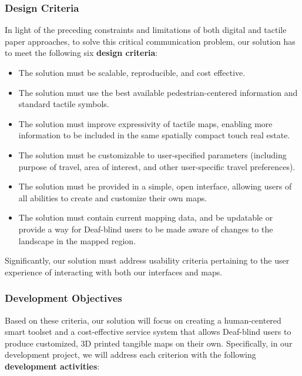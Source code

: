 \subsubsection{Design Criteria}
\label{sec:design-criteria}
In light of the preceding constraints and limitations of both digital and tactile paper approaches, to solve this critical communication problem, our solution has to meet the following six \textbf{design criteria}: 
\begin{itemize}
 \item The solution must be scalable, reproducible, and cost effective. 
 \item The solution must use the best available pedestrian-centered information and standard tactile symbols. 
 \item The solution must improve expressivity of tactile maps, enabling more information to be included in the same spatially compact touch real estate.
 \item The solution must be customizable to user-specified parameters (including purpose of travel, area of interest, and other user-specific travel preferences). 
 \item The solution must be provided in a simple, open interface, allowing users of all abilities to create and customize their own maps. 
 \item The solution must contain current mapping data, and be updatable or provide a way for Deaf-blind users to be made aware of changes to the landscape in the mapped region.
\end{itemize}
Significantly, our solution must address usability criteria pertaining to the user experience of interacting with both our interfaces and maps. 

\subsubsection{Development Objectives}
\label{sec:design-objectives}

Based on these criteria, our solution will focus on creating a human-centered smart toolset and a cost-effective service system that allows Deaf-blind users to produce customized, 3D printed tangible maps on their own. %
Specifically, in our development project, we will address each criterion with the following \textbf{development activities}:

